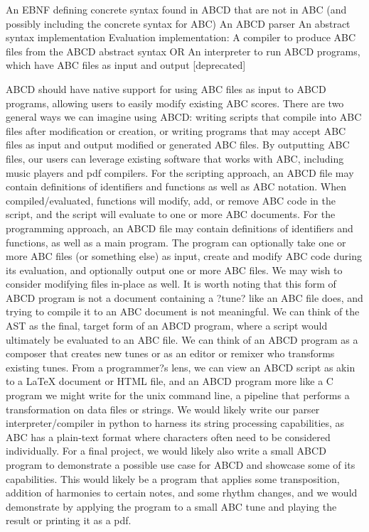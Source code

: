 An EBNF defining concrete syntax found in ABCD that are not in ABC (and possibly including the concrete syntax for ABC)
An ABCD parser
An abstract syntax implementation
Evaluation implementation:
A compiler to produce ABC files from the ABCD abstract syntax OR
An interpreter to run ABCD programs, which have ABC files as input and output [deprecated]

	ABCD should have native support for using ABC files as input to ABCD programs, allowing users to easily modify existing ABC scores. There are two general ways we can imagine using ABCD: writing scripts that compile into ABC files after modification or creation, or writing programs that may accept ABC files as input and output modified or generated ABC files. By outputting ABC files, our users can leverage existing software that works with ABC, including music players and pdf compilers.
	For the scripting approach, an ABCD file may contain definitions of identifiers and functions as well as ABC notation. When compiled/evaluated, functions will modify, add, or remove ABC code in the script, and the script will evaluate to one or more ABC documents.
	For the programming approach, an ABCD file may contain definitions of identifiers and functions, as well as a main program. The program can optionally take one or more ABC files (or something else) as input, create and modify ABC code during its evaluation, and optionally output one or more ABC files. We may wish to consider modifying files in-place as well. It is worth noting that this form of ABCD program is not a document containing a ?tune? like an ABC file does, and trying to compile it to an ABC document is not meaningful. We can think of the AST as the final, target form of an ABCD program, where a script would ultimately be evaluated to an ABC file. We can think of an ABCD program as a composer that creates new tunes or as an editor or remixer who transforms existing tunes. From a programmer?s lens, we can view an ABCD script as akin to a LaTeX document or HTML file, and an ABCD program more like a C program we might write for the unix command line, a pipeline that performs a transformation on data files or strings.
	We would likely write our parser interpreter/compiler in python to harness its string processing capabilities, as ABC has a plain-text format where characters often need to be considered individually.
	For a final project, we would likely also write a small ABCD program to demonstrate a possible use case for ABCD and showcase some of its capabilities. This would likely be a program that applies some transposition, addition of harmonies to certain notes, and some rhythm changes, and we would demonstrate by applying the program to a small ABC tune and playing the result or printing it as a pdf.
 
